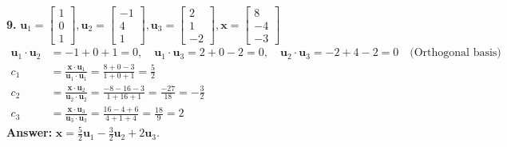 \documentclass[11pt, letterpaper]{article}
\theoremstyle{definition}
\theoremstyle{remark}
\begin{document}
\textbf{9.} $\mathbf{u}_1 = \begin{bmatrix} 1 \\ 0 \\ 1 \end{bmatrix}, \mathbf{u}_2 = \begin{bmatrix} -1 \\ 4 \\ 1 \end{bmatrix}, \mathbf{u}_3 = \begin{bmatrix} 2 \\ 1 \\ -2 \end{bmatrix}, \mathbf{x} = \begin{bmatrix} 8 \\ -4 \\ -3 \end{bmatrix}$
\begin{align*}
    \mathbf{u}_1 \cdot \mathbf{u}_2 &= -1 + 0 + 1 = 0, \quad \mathbf{u}_1 \cdot \mathbf{u}_3 = 2 + 0 - 2 = 0, \quad \mathbf{u}_2 \cdot \mathbf{u}_3 = -2 + 4 - 2 = 0 \quad \text{(Orthogonal basis)} \\
    c_1 &= \frac{\mathbf{x} \cdot \mathbf{u}_1}{\mathbf{u}_1 \cdot \mathbf{u}_1} = \frac{8 + 0 - 3}{1 + 0 + 1} = \frac{5}{2} \\
    c_2 &= \frac{\mathbf{x} \cdot \mathbf{u}_2}{\mathbf{u}_2 \cdot \mathbf{u}_2} = \frac{-8 - 16 - 3}{1 + 16 + 1} = \frac{-27}{18} = -\frac{3}{2} \\
    c_3 &= \frac{\mathbf{x} \cdot \mathbf{u}_3}{\mathbf{u}_3 \cdot \mathbf{u}_3} = \frac{16 - 4 + 6}{4 + 1 + 4} = \frac{18}{9} = 2
\end{align*}
\textbf{Answer:} $\mathbf{x} = \frac{5}{2}\mathbf{u}_1 - \frac{3}{2}\mathbf{u}_2 + 2\mathbf{u}_3$.
\end{document}
